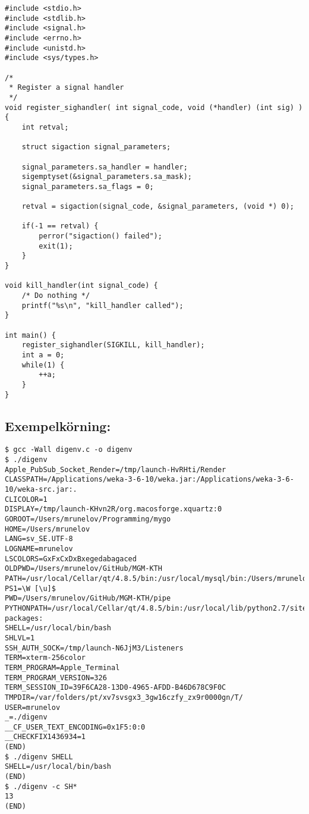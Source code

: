 \documentclass[paper=a4, fontsize=11pt]{scrartcl} %
\numberwithin{equation}{section} %
\numberwithin{figure}{section} %
\numberwithin{table}{section} %
\begin{document}
\begin{verbatim}
#include <stdio.h>
#include <stdlib.h>
#include <signal.h>
#include <errno.h>
#include <unistd.h>
#include <sys/types.h>

/*
 * Register a signal handler
 */
void register_sighandler( int signal_code, void (*handler) (int sig) )  {
    int retval;

    struct sigaction signal_parameters;

    signal_parameters.sa_handler = handler;
    sigemptyset(&signal_parameters.sa_mask);
    signal_parameters.sa_flags = 0;

    retval = sigaction(signal_code, &signal_parameters, (void *) 0);

    if(-1 == retval) {
        perror("sigaction() failed");
        exit(1);
    }
}

void kill_handler(int signal_code) {
    /* Do nothing */
    printf("%s\n", "kill_handler called");
}

int main() {
    register_sighandler(SIGKILL, kill_handler);
    int a = 0;
    while(1) {
        ++a;
    }
}
\end{verbatim}


\newpage
\subsection*{Exempelkörning:}

\begin{verbatim}
$ gcc -Wall digenv.c -o digenv
$ ./digenv 
Apple_PubSub_Socket_Render=/tmp/launch-HvRHti/Render
CLASSPATH=/Applications/weka-3-6-10/weka.jar:/Applications/weka-3-6-10/weka-src.jar:.
CLICOLOR=1
DISPLAY=/tmp/launch-KHvn2R/org.macosforge.xquartz:0
GOROOT=/Users/mrunelov/Programming/mygo
HOME=/Users/mrunelov
LANG=sv_SE.UTF-8
LOGNAME=mrunelov
LSCOLORS=GxFxCxDxBxegedabagaced
OLDPWD=/Users/mrunelov/GitHub/MGM-KTH
PATH=/usr/local/Cellar/qt/4.8.5/bin:/usr/local/mysql/bin:/Users/mrunelov/scripts:/opt/local/bin:/opt/local/sbin:/usr/local/bin:/usr/local/google_appengine:/usr/local:/Library/Frameworks/Python.framework/Versions/2.7/bin:/usr/local/bin:/usr/bin:/bin:/usr/sbin:/sbin:/opt/X11/bin:/usr/local/go/bin:/usr/texbin:/Users/mrunelov/Programming/mygo/bin:/usr/local/go/bin
PS1=\W [\u]$ 
PWD=/Users/mrunelov/GitHub/MGM-KTH/pipe
PYTHONPATH=/usr/local/Cellar/qt/4.8.5/bin:/usr/local/lib/python2.7/site-packages:
SHELL=/usr/local/bin/bash
SHLVL=1
SSH_AUTH_SOCK=/tmp/launch-N6JjM3/Listeners
TERM=xterm-256color
TERM_PROGRAM=Apple_Terminal
TERM_PROGRAM_VERSION=326
TERM_SESSION_ID=39F6CA28-13D0-4965-AFDD-B46D678C9F0C
TMPDIR=/var/folders/pt/xv7svsgx3_3gw16czfy_zx9r0000gn/T/
USER=mrunelov
_=./digenv
__CF_USER_TEXT_ENCODING=0x1F5:0:0
__CHECKFIX1436934=1
(END) 
$ ./digenv SHELL
SHELL=/usr/local/bin/bash
(END) 
$ ./digenv -c SH*
13
(END)
\end{verbatim}

\end{document}
